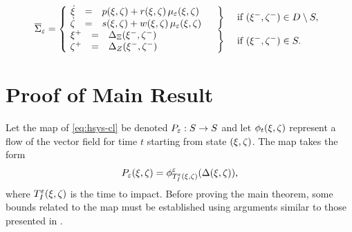 \begin{align}
  \label{eq:zd-hsys-cl}
  \HSbar_{\resclfparam} = \left\{\!\!\!\!
    \begin{array}{l c l}
      \begin{array}{r c l}
        {\dot \zdx} &=& \rff\argsxz + \rfg\argsxz \, \mueps\argsxz\\
        {\dot \zdz} &=& \rfq\argsxz + \rfw\argsxz \, \mueps\argsxz
      \end{array} &
      \left.\vphantom{\begin{array}{r c l}
            {\dot \zdx} &=& \rff\argsxz + \rfg\argsxz \, \mueps\argsxz\\
            {\dot \zdz} &=& \rfq\argsxz + \rfw\argsxz \, \mueps\argsxz
          \end{array}}\right\} & \mbox{ if } \argsxzm \in \D \setminus \Guard,\\
      \begin{array}{r c l}
        \zdx^{+} &=& \DeltaX(\zdx^{-}, \zdz^{-})\\
        \zdz^{+} &=& \DeltaZ(\zdx^{-}, \zdz^{-})
      \end{array}  &
      \left.\vphantom{\begin{array}{r c l}
            \zdx^{+} &=& \DeltaX(\zdx^{-}, \zdz^{-})\\
            \zdz^{+} &=& \DeltaZ(\zdx^{-}, \zdz^{-})
          \end{array}}\right\} & \mbox{ if } \argsxzm \in \Guard.
    \end{array}\right.
\end{align}

\section{Proof of Main Result} \label{sec:proof}

Let the \Poincare{} map of \eqref{eq:hsys-cl} be denoted $P_{\varepsilon} : S \to
S$ and let $\phi_{t}(\xi, \zeta)$ represent a flow of the vector field for time
$t$ starting from state $(\xi, \zeta)$.
% 
The \Poincare{} map takes the form
% 
\begin{align}
  \label{eq:poincare}
  P_{\varepsilon}(\xi, \zeta) = \phi^{\varepsilon}_{T_{I}^{\varepsilon}(\xi, \zeta)}(\Delta(\xi, \zeta)),
\end{align}
% 
where $T_{I}^{\varepsilon}(\xi, \zeta)$ is the time to impact.
% 
Before proving the main theorem, some bounds related to the \Poincare{} map must
be established using arguments similar to those presented in \cite{Ames2014,
  Morris2005}.

